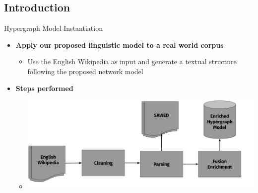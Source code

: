 \documentclass[10pt,=table]{beamer}
\begin{document}
\subsection{Introduction}
\begin{frame}{Hypergraph Model Instantiation}
\begin{itemize}
\item<1-> \large \textbf{Apply our proposed linguistic model to a real world corpus}
	\begin{itemize}
	\item<1-> Use the English Wikipedia as input and generate a textual structure following the proposed network model
	\end{itemize}
\item<2-> \large \textbf{Steps performed}	
\begin{itemize}
	\item<2->[] \begin{center}
		\includegraphics[width=0.7\linewidth]{image2/Chapitre7/saewd}
		\end{center}

\end{itemize}

\end{itemize}

\end{frame} 
\end{document}
